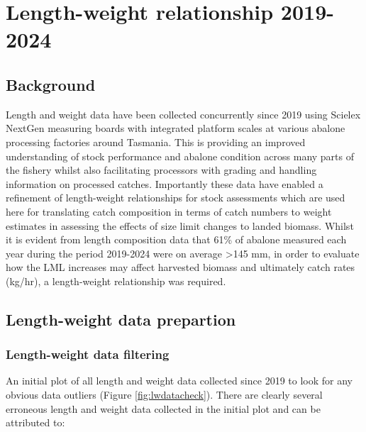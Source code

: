 \documentclass[
]{article}
\begin{document}
\section{Length-weight relationship 2019-2024}\label{length-weight-relationship-2019-2024}

\subsection{Background}\label{background-1}

Length and weight data have been collected concurrently since 2019 using Scielex NextGen measuring boards with integrated platform scales at various abalone processing factories around Tasmania. This is providing an improved understanding of stock performance and abalone condition across many parts of the fishery whilst also facilitating processors with grading and handling information on processed catches. Importantly these data have enabled a refinement of length-weight relationships for stock assessments which are used here for translating catch composition in terms of catch numbers to weight estimates in assessing the effects of size limit changes to landed biomass. Whilst it is evident from length composition data that 61\% of abalone measured each year during the period 2019-2024 were on average \textgreater145 mm, in order to evaluate how the LML increases may affect harvested biomass and ultimately catch rates (kg/hr), a length-weight relationship was required.

\subsection{Length-weight data prepartion}\label{length-weight-data-prepartion}

\subsubsection{Length-weight data filtering}\label{length-weight-data-filtering}

An initial plot of all length and weight data collected since 2019 to look for any obvious data outliers (Figure \ref{fig:lwdatacheck}). There are clearly several erroneous length and weight data collected in the initial plot and can be attributed to:
\end{document}
